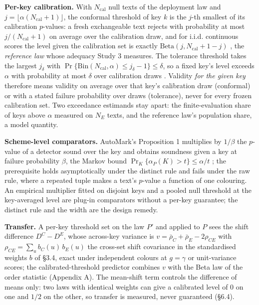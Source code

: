 \documentclass[11pt,letterpaper]{article}
\begin{document}
\textbf{Per-key calibration.} With \(N_{\mathrm{cal}}\) null texts of the deployment law and \(j = \lfloor \alpha(N_{\mathrm{cal}}+1) \rfloor\), the conformal threshold of key \(k\) is the \(j\)-th smallest of its calibration \(p\)-values: a fresh exchangeable text rejects with probability at most \(j/(N_{\mathrm{cal}}+1)\) on average over the calibration draw, and for i.i.d. continuous scores the level given the calibration set is exactly \(\mathrm{Beta}(j, N_{\mathrm{cal}}+1-j)\) \citep{vovk2012conditional}, the \emph{reference law} whose adequacy Study 3 measures. The tolerance threshold takes the largest \(j_\delta\) with \(\Pr\{\mathrm{Bin}(N_{\mathrm{cal}}, \alpha) \le j_\delta - 1\} \le \delta\), so a fixed key's level exceeds \(\alpha\) with probability at most \(\delta\) over calibration draws \citep[Proposition 2b]{vovk2012conditional}. Validity \emph{for the given key} therefore means validity on average over that key's calibration draw (conformal) or with a stated failure probability over draws (tolerance), never for every frozen calibration set. Two exceedance estimands stay apart: the finite-evaluation share of keys above \(\alpha\) measured on \(N_E\) texts, and the reference law's population share, a model quantity.

\textbf{Scheme-level comparators.} AutoMark's Proposition 1 multiplies by \(1/\beta\) the \(p\)-value of a detector sound over the key and obtains soundness given a key at failure probability \(\beta\), the Markov bound \(\Pr_K\{\alpha_P(K) > t\} \le \alpha/t\) \citep{gloaguen2026automark}; the prerequisite holds asymptotically under the distinct rule and fails under the raw rule, where a repeated tuple makes a text's \(p\)-value a function of one colouring. An empirical multiplier fitted on disjoint keys and a pooled null threshold at the key-averaged level are plug-in comparators without a per-key guarantee; the distinct rule and the width are the design remedy.

\textbf{Transfer.} A per-key threshold set on the law \(P'\) and applied to \(P\) sees the shift difference \(D^{C} - D^{E}\), whose across-key variance is \(v = \bar\rho_C + \bar\rho_E - 2\rho_{CE}\) with \(\rho_{CE} = \sum_u b_C(u)\,b_E(u)\) the cross-set shift covariance in the standardised weights \(b\) of \S{}3.4, exact under independent colours at \(g = \gamma\) or unit-variance scores; the calibrated-threshold predictor combines \(v\) with the Beta law of the order statistic (Appendix A). The mean-shift term controls the difference of means only: two laws with identical weights can give a calibrated level of \(0\) on one and \(1/2\) on the other, so transfer is measured, never guaranteed (\S{}6.4).
\end{document}
